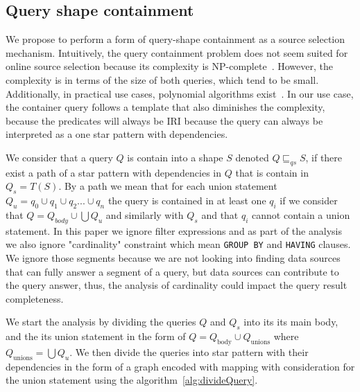 \subsection{Query shape containment}\label{sec:containment}

We propose to perform a form of query-shape containment as a source selection mechanism.
Intuitively, the query containment problem does not seem suited for online source selection because its complexity is NP-complete~\cite{Spasi2023}.
However, the complexity is in terms of the size of both queries, which tend to be small.
Additionally, in practical use cases, polynomial algorithms exist~\cite{Doan2012}.
In our use case, the container query follows a template that also diminishes the complexity, because the predicates will always be 
IRI because the query can always be interpreted as a one star pattern with dependencies.

We consider that a query $Q$ is contain into a shape $S$ denoted $Q \sqsubseteq_{qs} S$, if there exist a path of a star pattern with dependencies in $Q$ 
that is contain in $Q_s = T(S)$.
By a path we mean that for each union statement $Q_u = q_0 \cup q_1 \cup q_2 ... \cup q_n$ the query is contained in at least one $q_i$ if we 
consider that $Q = Q_{body} \cup \bigcup Q_u$ and similarly with $Q_s$ and that $q_i$ cannot contain a union statement.
In this paper we ignore filter expressions and as part of the analysis we also ignore "cardinality" constraint 
which mean \texttt{GROUP BY} and \texttt{HAVING} clauses.
We ignore those segments because we are not looking into finding data sources that can fully answer a segment of a query,
but data sources can contribute to the query answer, thus, the analysis of cardinality could impact the query result completeness.

We start the analysis by dividing the queries $Q$ and $Q_s$ into its its main body, and the its union statement in the form of 
$Q = Q_{\text{body}} \cup Q_{\text{unions}}$ where $Q_{\text{unions}} = \bigcup Q_u$.
We then divide the queries into star pattern with their dependencies in the form of a graph encoded with mapping with consideration for the union statement using the algorithm~\ref{alg:divideQuery}.

